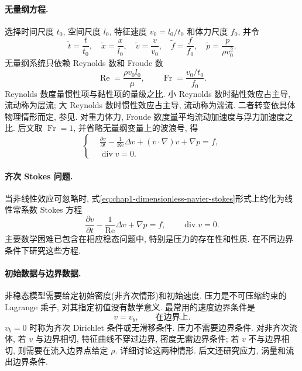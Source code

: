 \paragraph{无量纲方程.}
\label{subsec:chap1-dimensionless-equations}
选择时间尺度 $t_0$, 空间尺度 $l_0$, 特征速度 $v_0=l_0/t_0$ 和体力尺度 $f_0$, 并令
\[
  \widetilde t=\frac t{t_0},\quad \widetilde x=\frac x{l_0},\quad
  \widetilde v=\frac v{v_0},\quad \widetilde f=\frac f{f_0},\quad
  \widetilde p=\frac p{\rho v_0^2}.
\]
无量纲系统只依赖 Reynolds 数和 Froude 数
\[
  \operatorname{Re}=\frac{\rho v_0l_0}{\mu},\qquad
  \operatorname{Fr}=\frac{v_0/t_0}{f_0}.
\]
Reynolds 数度量惯性项与黏性项的量级之比. 小 Reynolds 数时黏性效应占主导, 流动称为层流; 大 Reynolds 数时惯性效应占主导, 流动称为湍流. 二者转变依具体物理情形而定, 参见. 对重力体力, Froude 数度量平均流动加速度与浮力加速度之比. 后文取 $\operatorname{Fr}=1$, 并省略无量纲变量上的波浪号, 得
\begin{equation}
\label{eq:chap1-dimensionless-navier-stokes}
\left\{\begin{aligned}
&\frac{\partial v}{\partial t}-\frac1{\operatorname{Re}}\Delta v+(v\cdot\nabla)v+\nabla p=f,\\
&\operatorname{div}v=0.
\end{aligned}\right.
\end{equation}

\paragraph{齐次 Stokes 问题.}
\label{subsec:chap1-homogeneous-stokes}
当非线性效应可忽略时, 式\eqref{eq:chap1-dimensionless-navier-stokes}形式上约化为线性常系数 Stokes 方程
\[
\frac{\partial v}{\partial t}-\frac1{\operatorname{Re}}\Delta v+\nabla p=f,
\qquad\operatorname{div}v=0.
\]
主要数学困难已包含在相应稳态问题中, 特别是压力的存在性和性质.  在不同边界条件下研究这些方程.

\paragraph{初始数据与边界数据.}
\label{subsec:chap1-initial-boundary-data}
非稳态模型需要给定初始密度(非齐次情形)和初始速度. 压力是不可压缩约束的 Lagrange 乘子, 对其指定初值没有数学意义. 最常用的速度边界条件是
\[
  v=v_b,\qquad\text{在边界上}.
\]
$v_b=0$ 时称为齐次 Dirichlet 条件或无滑移条件. 压力不需要边界条件. 对非齐次流体, 若 $v$ 与边界相切, 特征曲线不穿过边界, 密度无需边界条件; 若 $v$ 不与边界相切, 则需要在流入边界点给定 $\rho$.  详细讨论这两种情形. 后文还研究应力, 涡量和流出边界条件.

